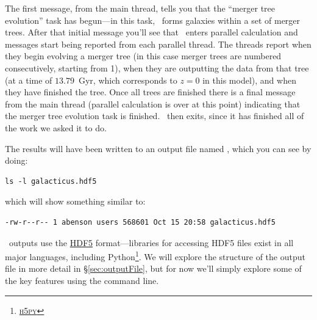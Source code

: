 The first message, from the main thread, tells you that the ``merger tree evolution'' task has begun---in this task, \glc\ forms galaxies within a set of merger trees. After that initial message you'll see that \glc\ enters parallel calculation and messages start being reported from each parallel thread. The threads report when they begin evolving a merger tree (in this case merger trees are numbered consecutively, starting from 1), when they are outputting the data from that tree (at a time of $13.79$~Gyr, which corresponds to $z=0$ in this model), and when they have finished the tree. Once all trees are finished there is a final message from the main thread (parallel calculation is over at this point) indicating that the merger tree evolution task is finished. \glc\ then exits, since it has finished all of the work we asked it to do.

The results will have been written to an output file named , which you can see by doing:
\begin{verbatim}
ls -l galacticus.hdf5
\end{verbatim}
which will show something similar to:
\begin{verbatim}
-rw-r--r-- 1 abenson users 568601 Oct 15 20:58 galacticus.hdf5
\end{verbatim}
\glc\ outputs use the \href{https://www.hdfgroup.org/solutions/hdf5/}{HDF5} format---libraries for accessing HDF5 files exist in all major languages, including Python\footnote{\href{https://www.h5py.org/}{{\normalfont \scshape h5py}}}. We will explore the structure of the output file in more detail in \S\ref{sec:outputFile}, but for now we'll simply explore some of the key features using the command line.

